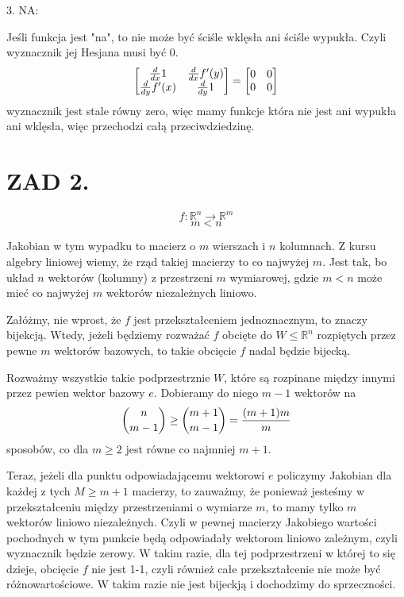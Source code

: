 \documentclass{article}[13pt]
\newcommand{\R}{\mathds{R}}
\begin{document}
{\color{red}3. NA:}
\medskip

Jeśli funkcja jest "na", to nie może być ściśle wklęsła ani ściśle wypukła. Czyli wyznacznik jej Hesjana musi być 0.
\begin{align*}
    \begin{bmatrix}
        {d\over dx}1 & {d\over dx} f'(y)\\
        {d\over dy}f'(x) & {d\over dy}1
    \end{bmatrix}=
    \begin{bmatrix}
        0 & 0\\
        0 & 0
    \end{bmatrix}
\end{align*}
wyznacznik jest stale równy zero, więc mamy funkcje która nie jest ani wypukła ani wklęsła, więc przechodzi całą przeciwdziedzinę.


\section*{ZAD 2.}

$$f:\R^n\to\R^m$$
$$m<n$$

Jakobian w tym wypadku to macierz o $m$ wierszach i $n$ kolumnach. Z kursu algebry liniowej wiemy, że rząd takiej macierzy to co najwyżej $m$. Jest tak, bo układ $n$ wektorów (kolumny) z przestrzeni $m$ wymiarowej, gdzie $m<n$ może mieć co najwyżej $m$ wektorów niezależnych liniowo.
\medskip

Załóżmy, nie wprost, że $f$ jest przekształceniem jednoznacznym, to znaczy bijekcją. Wtedy, jeżeli będziemy rozważać $f$ obcięte do $W\leq\R^n$ rozpiętych przez pewne $m$ wektorów bazowych, to takie obcięcie $f$ nadal będzie bijecką.
\medskip

Rozważmy wszystkie takie podprzestrznie $W$, które są rozpinane między innymi przez pewien wektor bazowy $e$. Dobieramy do niego $m-1$ wektorów na
$${n\choose m-1}\geq{m+1\choose m-1}={(m+1)m\over m}$$
sposobów, co dla $m\geq2$ jest równe co najmniej $m+1$. 
\medskip

Teraz, jeżeli dla punktu odpowiadającemu wektorowi $e$ policzymy Jakobian dla każdej z tych $M\geq m+1$ macierzy, to zauważmy, że ponieważ jesteśmy w przekształceniu między przestrzeniami o wymiarze $m$, to mamy tylko $m$ wektorów liniowo niezależnych. Czyli w pewnej macierzy Jakobiego wartości pochodnych w tym punkcie będą odpowiadały wektorom liniowo zależnym, czyli wyznacznik będzie zerowy. W takim razie, dla tej podprzestrzeni w której to się dzieje, obcięcie $f$ nie jest 1-1, czyli również całe przekształcenie nie może być różnowartościowe. W takim razie nie jest bijeckją i dochodzimy do sprzeczności.
\end{document}
